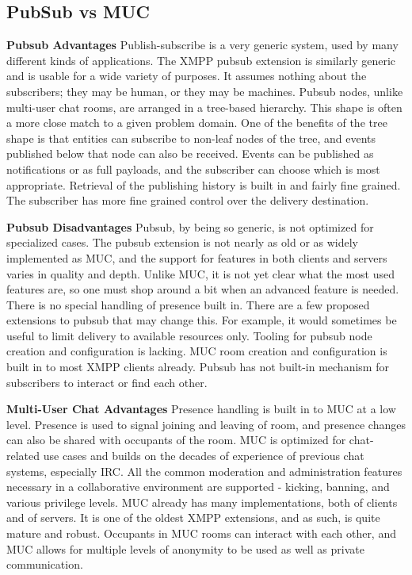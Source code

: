  \subsection{PubSub vs MUC}
	\textbf{Pubsub Advantages}
	\newline
	Publish-subscribe is a very generic system, used by many different kinds of applications. The XMPP pubsub extension is similarly generic and is usable for a wide variety of purposes. It assumes nothing about the subscribers; they may be human, or they may be machines. Pubsub nodes, unlike multi-user chat rooms, are arranged in a tree-based hierarchy. This shape is often a more close match to a given problem domain. One of the benefits of the tree shape is that entities can subscribe to non-leaf nodes of the tree, and events published below that node can also be received. Events can be published as notifications or as full payloads, and the subscriber can choose which is most appropriate. Retrieval of the publishing history is built in and fairly fine grained. The subscriber has more fine grained control over the delivery destination. 

	\textbf{Pubsub Disadvantages}
	\newline
	Pubsub, by being so generic, is not optimized for specialized cases. The pubsub extension is not nearly as old or as widely implemented as MUC, and the support for features in both clients and servers varies in quality and depth. Unlike MUC, it is not yet clear what the most used features are, so one must shop around a bit when an advanced feature is needed. There is no special handling of presence built in. There are a few proposed extensions to pubsub that may change this. For example, it would sometimes be useful to limit delivery to available resources only. Tooling for pubsub node creation and configuration is lacking. MUC room creation and configuration is built in to most XMPP clients already. Pubsub has not built-in mechanism for subscribers to interact or find each other. 

	\textbf{Multi-User Chat Advantages}
	\newline
	Presence handling is built in to MUC at a low level. Presence is used to signal joining and leaving of room, and presence changes can also be shared with occupants of the room. MUC is optimized for chat-related use cases and builds on the decades of experience of previous chat systems, especially IRC. All the common moderation and administration features necessary in a collaborative environment are supported - kicking, banning, and various privilege levels. MUC already has many implementations, both of clients and of servers. It is one of the oldest XMPP extensions, and as such, is quite mature and robust. Occupants in MUC rooms can interact with each other, and MUC allows for multiple levels of anonymity to be used as well as private communication.

